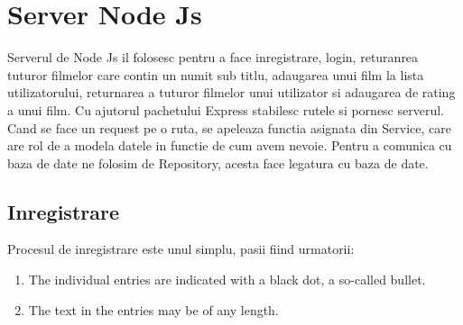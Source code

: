 \section{Server Node Js}
\label{sec:ch5sec1}

\par Serverul de Node Js il folosesc pentru a face inregistrare, login, returanrea tuturor filmelor care contin un numit sub titlu, adaugarea unui film la lista utilizatorului, returnarea a tuturor filmelor unui utilizator si adaugarea de rating a unui film. Cu ajutorul pachetului Express stabilesc rutele si pornesc serverul. Cand se face un request pe o ruta, se apeleaza functia asignata din Service, care are rol de a modela datele in functie de cum avem nevoie. Pentru a comunica cu baza de date ne folosim de Repository, acesta face legatura cu baza de date.

\subsection{Inregistrare}
\par Procesul de inregistrare este unul simplu, pasii fiind urmatorii:
\begin{enumerate}
  \item The individual entries are indicated with a black dot, a so-called bullet.
  \item The text in the entries may be of any length.
\end{enumerate}